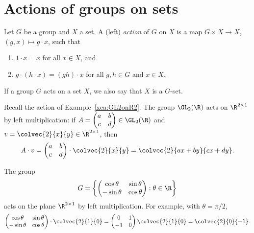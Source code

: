 
\section{Actions of groups on sets}

\begin{definition}
    Let $G$ be a group and $X$ a set. 
    A (left) \emph{action} of $G$ on $X$ is a map 
    $G\times X\to X$, $(g,x)\mapsto g\cdot x$, such that 
    \begin{enumerate}
        \item $1\cdot x=x$ for all $x\in X$, and 
        \item $g\cdot (h\cdot x)=(gh)\cdot x$ for all $g,h\in G$ and $x\in X$.
    \end{enumerate}
\end{definition}

If a group $G$ acts on a set $X$, we also say that
$X$ is a $G$-set. 

\begin{example}
    Recall the action of Example~\ref{xca:GL2onR2}. 
    The group $\GL_2(\R)$ acts on $\R^{2\times 1}$ by left multiplication: if 
    $A=\begin{pmatrix}
        a&b\\
        c&d
    \end{pmatrix}\in\GL_2(\R)$ and $v=\colvec{2}{x}{y}\in\R^{2\times1}$, then 
    \[ 
    A\cdot v=\begin{pmatrix}
        a&b\\
        c&d
    \end{pmatrix}
    \cdot\colvec{2}{x}{y}=\colvec{2}{ax+by}{cx+dy}.
    \]
\end{example}

\begin{example}
    The group 
    \[
    G=\left\{\begin{pmatrix}
        \cos\theta & \sin\theta\\
        -\sin\theta & \cos\theta
    \end{pmatrix}:\theta\in\R\right\}
    \]
    acts on the plane $\R^{2\times 1}$ by left multiplication. For example, with $\theta=\pi/2$, 
    \[ 
    \begin{pmatrix}
        \cos\theta & \sin\theta\\
        -\sin\theta & \cos\theta
    \end{pmatrix}\cdot \colvec{2}{1}{0}
    =\begin{pmatrix} 
    0&1\\
    -1&0
    \end{pmatrix}
    \colvec{2}{1}{0}
    =\colvec{2}{0}{-1}.
    \]
\end{example}

